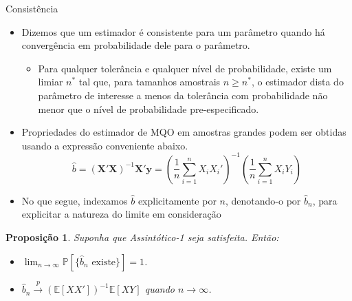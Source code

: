 \documentclass[11pt]{beamer}
\newtheorem{proposition}{Proposição}
\begin{document}
\begin{frame}{Consistência}
	\begin{itemize}
		\item Dizemos que um estimador é {\color{blue}consistente para um parâmetro} quando há convergência em probabilidade dele para o parâmetro.
		\begin{itemize}
			\item Para qualquer tolerância e qualquer nível de probabilidade, existe um limiar $n^*$ tal que, para tamanhos amostrais $n\geq n^*$, o estimador dista do parâmetro de interesse a menos da tolerância com probabilidade não menor que o nível de probabilidade pre-especificado.
		\end{itemize} 
		\item Propriedades do estimador de MQO em amostras grandes podem ser obtidas usando a expressão conveniente abaixo.
		$$\hat{b} = (\boldsymbol{X}'\boldsymbol{X})^{-1}\boldsymbol{X}'\boldsymbol{y} = \left(\frac{1}{n}\sum_{i=1}^n X_i X_i'\right)^{-1}\left(\frac{1}{n}\sum_{i=1}^n X_iY_i\right)$$
		\item No que segue, indexamos $\hat{b}$ explicitamente por $n$, denotando-o por $\hat{b}_n$, para explicitar a natureza do limite em consideração
	\end{itemize}
	
	\begin{proposition}
Suponha que Assintótico-1 seja satisfeita. Então:
\begin{itemize}
	\item $\lim_{n \to \infty}\mathbb{P}[\{\hat{b}_n \text{ existe}\}] = 1$.
	\item $\hat{b}_n \overset{p}{\to}\left(\mathbb{E}[XX']\right)^{-1}\mathbb{E}[XY]$ quando $n \to \infty$.
\end{itemize}

	\end{proposition}
	\end{frame}
	
\end{document}
